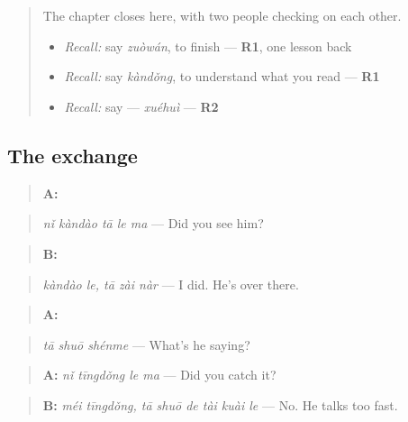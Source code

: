\section[Practice]{}

\label{lesson:ZH-C151-practice}



\begin{quote}
The chapter closes here, with two people checking on each other.

\begin{itemize}
\raggedright
  \item \emph{Recall:} say \emph{zuòwán}, to finish — \textbf{R1}, one lesson back
  \item \emph{Recall:} say \emph{kàndǒng}, to understand what you read — \textbf{R1}
  \item \emph{Recall:} say  — \emph{xuéhuì} — \textbf{R2}
\end{itemize}
\end{quote}

\subsection*{The exchange}
\begin{quote}
\textbf{A:} 
\end{quote}

\begin{quote}
\emph{nǐ kàndào tā le ma} — Did you see him?
\end{quote}

\begin{quote}
\textbf{B:}  
\end{quote}

\begin{quote}
\emph{kàndào le, tā zài nàr} — I did. He's over there.
\end{quote}

\begin{quote}
\textbf{A:} 
\end{quote}

\begin{quote}
\emph{tā shuō shénme} — What's he saying?
\end{quote}

\begin{quote}
\textbf{A:} \emph{nǐ tīngdǒng le ma} — Did you catch it?
\end{quote}

\begin{quote}
\textbf{B:} \emph{méi tīngdǒng, tā shuō de tài kuài le} — No. He talks too fast.
\end{quote}

